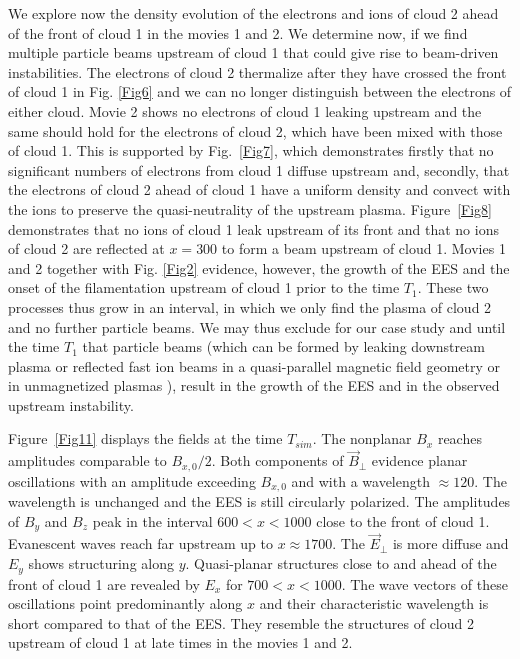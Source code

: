 \documentclass[structabstract]{aa}
\begin{document}
We explore now the density evolution of the electrons and ions of cloud 2 
ahead of the front of cloud 1 in the movies 1 and 2. We determine now, if 
we find multiple particle beams upstream of cloud 1 that could give rise
to beam-driven instabilities. The electrons of cloud 2 
thermalize after they have crossed the front of cloud 1 in Fig. \ref{Fig6} 
and we can no longer distinguish between the electrons of either cloud. 
Movie 2 shows no electrons of cloud 1 leaking upstream and the same should 
hold for the electrons of cloud 2, which have been mixed with those of cloud 1. 
This is supported by Fig.~\ref{Fig7}, which demonstrates firstly that no 
significant numbers of electrons from cloud 1 diffuse upstream and, secondly, 
that the electrons of cloud 2 ahead of cloud 1 have a uniform density and 
convect with the ions to preserve the quasi-neutrality of the upstream plasma. 
Figure~\ref{Fig8} demonstrates that no ions of cloud 1 leak upstream of its 
front and that no ions of cloud 2 are reflected at $x=300$ to form a beam 
upstream of cloud 1. Movies 1 and 2 together with Fig. \ref{Fig2} evidence, 
however, the growth of the EES and the onset of the filamentation upstream 
of cloud 1 prior to the time $T_1$. These two processes thus grow in an
interval, in which we only find the plasma of cloud 2 and no further particle
beams. We may thus exclude for our case study and until the time $T_{1}$ that 
particle beams (which can be formed by leaking downstream plasma 
or reflected fast ion beams in a quasi-parallel magnetic field geometry or in 
unmagnetized plasmas \citep{Malkov,Martins}), result in the growth of the EES 
and in the observed upstream instability.

Figure~\ref{Fig11} displays the fields at the time $T_{sim}$. The nonplanar 
$B_x$ reaches amplitudes comparable to $B_{x,0}/2$. Both components of 
$\vec{B}_\perp$ evidence planar oscillations with an amplitude exceeding 
$B_{x,0}$ and with a wavelength $\approx 120$. The wavelength is unchanged 
and the EES is still circularly polarized. The amplitudes of $B_y$ and $B_z$ 
peak in the interval $600<x<1000$ close to the front of cloud 1. Evanescent 
waves reach far upstream up to $x \approx 1700$. The $\vec{E}_\perp$ is more 
diffuse and $E_y$ shows structuring along $y$. Quasi-planar structures close 
to and ahead of the front of cloud 1 are revealed by $E_x$ for $700<x<1000$. 
The wave vectors of these oscillations point predominantly along $x$ and their 
characteristic wavelength is short compared to that of the EES. They resemble 
the structures of cloud 2 upstream of cloud 1 at late times in the movies 1 
and 2.  
\end{document}

